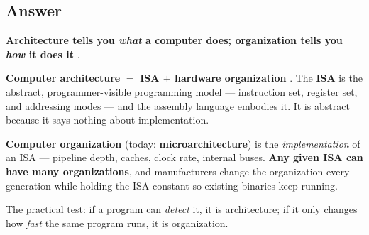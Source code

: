 \subsection*{Answer}

\begin{answerbox}
\textbf{Architecture tells you \emph{what} a computer does; organization tells
you \emph{how} it does it} .

\medskip
\textbf{Computer architecture} $=$ \textbf{ISA $+$ hardware organization}
. The \textbf{ISA} is the abstract, programmer-visible
programming model — instruction set, register set, and addressing modes — and
the assembly language embodies it. It is abstract because it says nothing about
implementation.

\medskip
\textbf{Computer organization} (today: \textbf{microarchitecture}) is the
\emph{implementation} of an ISA — pipeline depth, caches, clock rate, internal
buses. \textbf{Any given ISA can have many organizations}, and manufacturers
change the organization every generation while holding the ISA constant so
existing binaries keep running.

\medskip
The practical test: if a program can \emph{detect} it, it is architecture; if it
only changes how \emph{fast} the same program runs, it is organization.
\end{answerbox}


